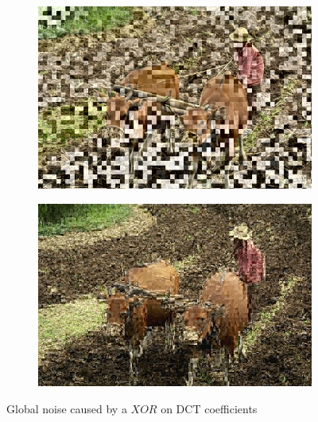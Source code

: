 \documentclass{article}
\begin{document}
\paragraph*{}
\begin{figure}[H]
  \centering
\end{figure}

\begin{figure}[ht]
\centering
\begin{subfigure}{4.0cm}
  \centering
  \includegraphics[width=0.95\linewidth]{figures/dc_xor_luminance_76_202012}
  \caption{}
  \label{fig:dc_xor}
\end{subfigure}%
\begin{subfigure}{4.0cm}
  \centering
  \includegraphics[width=0.95\linewidth]{figures/ac_xor_luminance_76_202012}
  \caption{}
  \label{fig:ac_xor}
\end{subfigure}
\caption{Global noise caused by a $XOR$ on DCT coefficients\label{fig:vs_bad}}
\end{figure}
\end{document}
